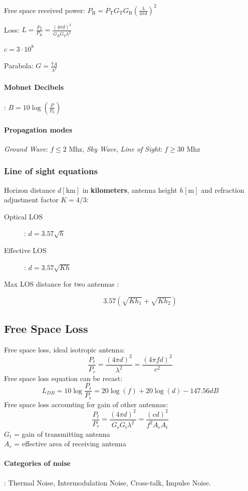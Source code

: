 \documentclass[6pt]{scrartcl}
\begin{document}
\begin{multicols}{4}
Free space received power: $P_\textrm{R} =  P_\textrm{T}G_\textrm{T}G_\textrm{R}(\frac{\lambda}{4\pi d})^2$

Loss: $L = \frac{P_T}{P_R} = \frac{(4\pi d)^2}{G_RG_T\lambda^2} $

$ c = 3 \cdot 10^8 $

Parabola: $G = \frac{7A}{\lambda^2}$

\paragraph{Mobnet Decibels}:
$B = 10\log(\frac{P}{P_0})$

\paragraph{Propagation modes}
\emph{Ground Wave}: $f \le 2$ Mhz, \emph{Sky Wave}, \emph{Line of Sight}: $f \ge 30$ Mhz

\subsubsection{Line of sight equations}
Horizon distance $d[\textrm{km}]$ in \textbf{kilometers}, antenna height $h[\textrm{m}]$ and refraction adjustment factor $K = 4/3$:
\begin{description}
\item[Optical LOS]: $d = 3.57\sqrt{h}$
\item[Effective LOS]: $d = 3.57\sqrt{Kh}$
\item[Max LOS distance for two antennas :] $$3.57(\sqrt{Kh_1}+ \sqrt{Kh_2})$$
\end{description}


\subsection{Free Space Loss}

Free space loss, ideal isotropic antenna:
$$ \frac{P_t}{P_r} = \frac{(4\pi d)^2}{\lambda^2} = \frac{(4\pi fd)^2}{c^2} $$
Free space loss equation can be recast:
$$L_{DB} = 10\log \frac{P_t}{P_r} = 20 \log(f) +20\log(d) - 147.56 dB$$
Free space loss accounting for gain of other antennas: 
$$\frac{P_t}{P_r} = \frac{(4\pi d)^2}{G_rG_t\lambda^2} = \frac{(cd)^2}{f^2A_rA_t}$$
$G_t$ = gain of transmitting antenna\\
$A_r$ = effective area of receiving antenna

\paragraph{Categories of noise}: Thermal Noise, Intermodulation Noise, Cross-talk, Impulse Noise.

\end{multicols}
\end{document}
